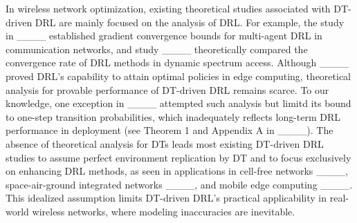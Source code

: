 In wireless network optimization, existing theoretical studies associated with DT-driven DRL are mainly focused on the analysis of DRL. For example, the study in ____ established gradient convergence bounds for multi-agent DRL in communication networks, and study ____ theoretically compared the convergence rate of DRL methods in dynamic spectrum access. Although ____ proved DRL’s capability to attain optimal policies in edge computing, theoretical analysis for provable performance of DT-driven DRL remains scarce. To our knowledge, one exception in ____ attempted such analysis but limitd its bound to one-step transition probabilities, which inadequately reflects long-term DRL performance in deployment (see Theorem 1 and Appendix A in ____). The absence of theoretical analysis for DTs leads most existing DT-driven DRL studies to assume perfect environment replication by DT and to focus exclusively on enhancing DRL methods, as seen in applications in cell-free networks ____, space-air-ground integrated networks ____, and mobile edge computing ____. This idealized assumption limits DT-driven DRL’s practical applicability in real-world wireless networks, where modeling inaccuracies are inevitable.
